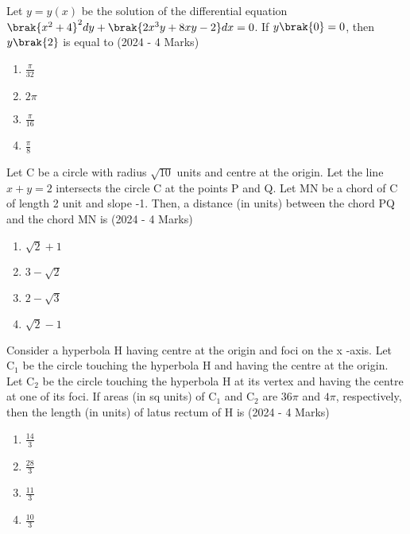 \item{
        	
        	
        	Let $y=y(x)$ be the solution of the differential equation 
        	$\brak{x^{2}+4}^{2} d y+\brak{2 x^{3} y+8 x y-2} d x=0$. If $y\brak{0}=0$, then $y\brak{2}$ is equal to
        	\hfill
        	{(2024 - 4 Marks)}
        	\begin{multicols}{4}
        		\begin{enumerate}
        			\item  $\frac{\pi}{32}$
        			\item  $2\pi$
        			\item  $\frac{\pi}{16}$
        			\item  $\frac{\pi}{8}$
        		\end{enumerate}
        	\end{multicols}
        	
        }
    \item{
     		
     		Let C be a circle with radius $\sqrt{10}$ units and centre at the origin. Let the 
     		line $x+y=2$ intersects the circle C at the points P and Q. Let MN be a chord of C 
     		of length 2 unit and slope -1. Then, a distance (in units) between the chord PQ and the chord MN is \text{ }
            \hfill
            {(2024 - 4 Marks)}
            \begin{multicols}{4}
                \begin{enumerate}
                	\item $\sqrt{2}+1$
                	\item $3-\sqrt{2}$
                	\item $2-\sqrt{3}$
                	\item $\sqrt{2}-1$
                \end{enumerate}
            \end{multicols}
        
        }
    \item{
            
            Consider a hyperbola H having centre at the origin and foci on the x -axis. Let $\mathrm{C}_{1}$ be the circle touching the hyperbola H and having the centre at the origin. Let $\mathrm{C}_{2}$ be the circle touching the hyperbola H at its vertex and having the centre at one of its foci. If areas (in sq units) of $\mathrm{C}_{1}$ and $\mathrm{C}_{2}$ are $36 \pi$ and $4 \pi$, respectively, then the length (in units) of latus rectum of H is \text{ }
           	\hfill
                {(2024 - 4 Marks)}
            
           \begin{multicols}{4}
            	\begin{enumerate}
            		\item $\frac{14}{3}$
            		\item $\frac{28}{3}$
            		\item $\frac{11}{3}$
            		\item $\frac{10}{3}$
            	\end{enumerate}
            \end{multicols}
        
        }
